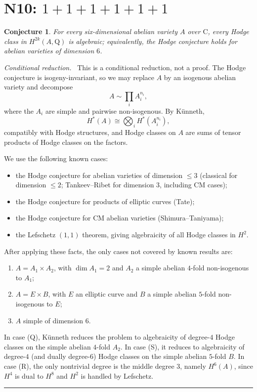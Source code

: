 \documentclass{article}
\newcommand{\mathbb}[1]{\mathrm{#1}}
\newtheorem{conjecture}{Conjecture}
\newenvironment{proof}[1][Proof]{\par\noindent\textit{#1.}\ }{\hfill\rule{1.2ex}{1.2ex}\par}
\begin{document}
\section*{N10: \(1+1+1+1+1+1\)}

\begin{conjecture}
For every six-dimensional abelian variety \(A\) over \(\mathbb{C}\), every Hodge class in \(H^{2k}(A,\mathbb{Q})\) is algebraic; equivalently, the Hodge conjecture holds for abelian varieties of dimension \(6\).
\end{conjecture}

\begin{proof}[Conditional reduction]
This is a conditional reduction, not a proof. The Hodge conjecture is isogeny-invariant, so we may replace \(A\) by an isogenous abelian variety and decompose
\[
A \sim \prod_i A_i^{n_i},
\]
where the \(A_i\) are simple and pairwise non-isogenous. By K\"unneth,
\[
H^*(A) \cong \bigotimes_i H^*(A_i^{n_i}),
\]
compatibly with Hodge structures, and Hodge classes on \(A\) are sums of tensor products of Hodge classes on the factors.

We use the following known cases:
\begin{itemize}
\item the Hodge conjecture for abelian varieties of dimension \(\le 3\) (classical for dimension \(\le 2\); Tankeev--Ribet for dimension \(3\), including CM cases);
\item the Hodge conjecture for products of elliptic curves (Tate);
\item the Hodge conjecture for CM abelian varieties (Shimura--Taniyama);
\item the Lefschetz \((1,1)\) theorem, giving algebraicity of all Hodge classes in \(H^2\).
\end{itemize}

After applying these facts, the only cases not covered by known results are:
\begin{enumerate}
\item[(Q)] \(A = A_1 \times A_2\), with \(\dim A_1 = 2\) and \(A_2\) a simple abelian \(4\)-fold non-isogenous to \(A_1\);
\item[(S)] \(A = E \times B\), with \(E\) an elliptic curve and \(B\) a simple abelian \(5\)-fold non-isogenous to \(E\);
\item[(R)] \(A\) simple of dimension \(6\).
\end{enumerate}

In case (Q), K\"unneth reduces the problem to algebraicity of degree-\(4\) Hodge classes on the simple abelian \(4\)-fold \(A_2\). In case (S), it reduces to algebraicity of degree-\(4\) (and dually degree-\(6\)) Hodge classes on the simple abelian \(5\)-fold \(B\). In case (R), the only nontrivial degree is the middle degree \(3\), namely \(H^6(A)\), since \(H^4\) is dual to \(H^8\) and \(H^2\) is handled by Lefschetz.


\end{proof}
\end{document}
